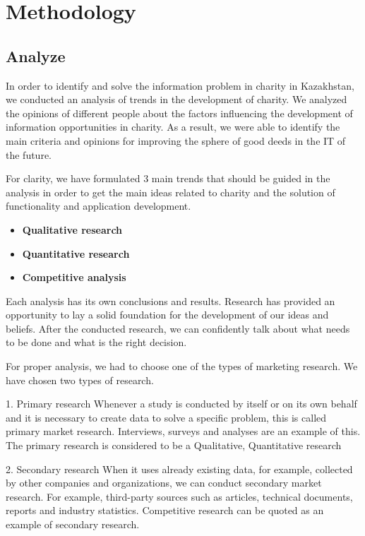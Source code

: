 \chapter{Methodology}\label{ch:A}

\section{Analyze}

In order to identify and solve the information problem in charity in Kazakhstan, we conducted an analysis of trends in the development of charity. We analyzed the opinions of different people about the factors influencing the development of information opportunities in charity. As a result, we were able to identify the main criteria and opinions for improving the sphere of good deeds in the IT of the future.

For clarity, we have formulated 3 main trends that should be guided in the analysis in order to get the main ideas related to charity and the solution of functionality and application development.

\begin{itemize}
    \item \textbf{Qualitative research}
    \item \textbf{Quantitative research}
    \item \textbf{Competitive analysis}
\end{itemize}

Each analysis has its own conclusions and results. Research has provided an opportunity to lay a solid foundation for the development of our ideas and beliefs. After the conducted research, we can confidently talk about what needs to be done and what is the right decision.

For proper analysis, we had to choose one of the types of marketing research. We have chosen two types of research.

1. Primary research
Whenever a study is conducted by itself or on its own behalf and it is necessary to create data to solve a specific problem, this is called primary market research. Interviews, surveys and analyses are an example of this. The primary research is considered to be a Qualitative, Quantitative research

2. Secondary research
When it uses already existing data, for example, collected by other companies and organizations, we can conduct secondary market research.
For example, third-party sources such as articles, technical documents, reports and industry statistics. Competitive research can be quoted as an example of secondary research.


